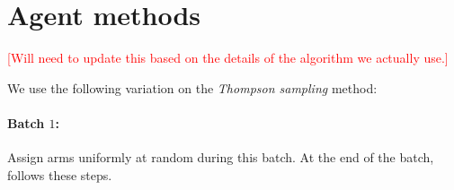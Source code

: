 \documentclass[letterpaper, 12pt, parskip=full, headsepline]{scrartcl}
\begin{document}
\section{Agent methods} \label{subsec:exploration_methods}

\textcolor{red}{[Will need to update this based on the details of the algorithm we actually use.]}


We use the following variation on the \textit{Thompson sampling} \citep{dimakopoulou2017estimation, dimakopoulou2019balanced} method:

\paragraph{Batch $1$:}

Assign arms uniformly at random during this batch. At the end of the batch, follows these steps.
\end{document}
